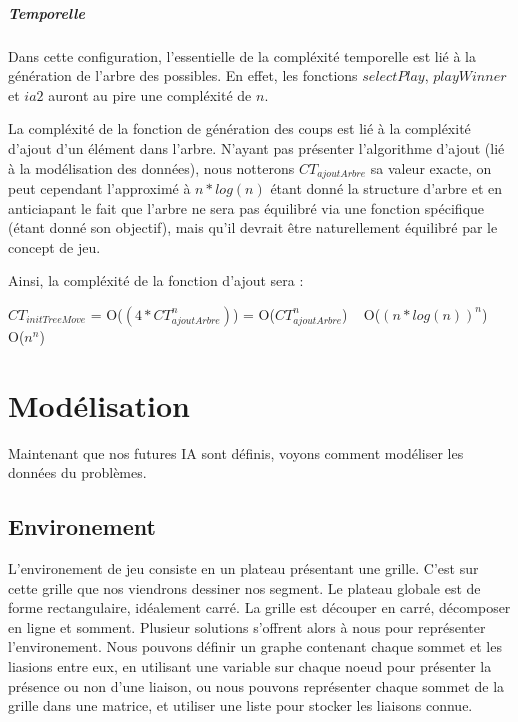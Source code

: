 \documentclass[a4paper,12pt]{report}
\begin{document}
\subsubsection{Temporelle}

Dans cette configuration, l'essentielle de la compl\'exit\'e temporelle est li\'e \`a la g\'en\'eration de l'arbre des possibles. En effet, les fonctions $selectPlay$, $playWinner$ et $ia2$ auront au pire une compl\'exit\'e de $n$. 

La compl\'exit\'e de la fonction de g\'en\'eration des coups est li\'e \`a la compl\'exit\'e d'ajout d'un \'el\'ement dans l'arbre. N'ayant pas pr\'esenter l'algorithme d'ajout (li\'e \`a la mod\'elisation des donn\'ees), nous notterons $CT_{ajoutArbre}$ sa valeur exacte, on peut cependant l'approxim\'e \`a $n*log(n)$ \'etant donn\'e la structure d'arbre et en anticiapant le fait que l'arbre ne sera pas \'equilibr\'e via une fonction sp\'ecifique (\'etant donn\'e son objectif), mais qu'il devrait \^etre naturellement \'equilibr\'e par le concept de jeu.

Ainsi, la compl\'exit\'e de la fonction d'ajout sera : 

$CT_{initTreeMove}$ = O($(4*CT_{ajoutArbre}^n)$) = O($CT_{ajoutArbre}^n$) ~ O($(n*log(n))^n$) ~ O($n^n$)


\part{Mod\'elisation}

Maintenant que nos futures IA sont d\'efinis, voyons comment mod\'eliser les donn\'ees du probl\`emes.

\chapter{Environement}

L'environement de jeu consiste en un plateau pr\'esentant une grille. C'est sur cette grille que nos viendrons dessiner nos segment. Le plateau globale est de forme rectangulaire, id\'ealement carr\'e. La grille est d\'ecouper en carr\'e, d\'ecomposer en ligne et somment. Plusieur solutions s'offrent alors \`a nous pour repr\'esenter l'environement. Nous pouvons d\'efinir un graphe contenant chaque sommet et les liasions entre eux, en utilisant une variable sur chaque noeud pour pr\'esenter la pr\'esence ou non d'une liaison, ou nous pouvons repr\'esenter chaque sommet de la grille dans une matrice, et utiliser une liste pour stocker les liaisons connue. \\
\end{document}

